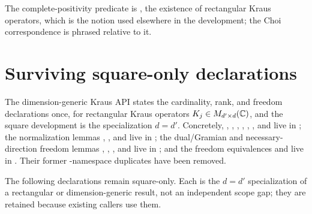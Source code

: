 \documentclass{article}
\begin{document}
The complete-positivity predicate is , the existence of
rectangular Kraus operators, which is the notion used elsewhere in the
development; the Choi correspondence is phrased relative to it.

\section{Surviving square-only declarations}

The dimension-generic Kraus API states the cardinality,
rank, and freedom declarations once, for rectangular Kraus
operators $K_j\in M_{d'\times d}(\mathbb{C})$, and the square development is the
specialization $d=d'$.  Concretely, ,
, ,
,
,
, and
 live in
; the normalization lemmas
,
, and
 live in
; the dual/Gramian and
necessary-direction freedom lemmas ,
,
, and 
live in ; and the freedom
equivalences  and
 live in
.  Their former
-namespace duplicates have been removed.

The following declarations remain square-only.  Each is the $d=d'$
specialization of a rectangular or dimension-generic result, not an
independent scope gap; they are retained because existing callers use
them.
\end{document}
